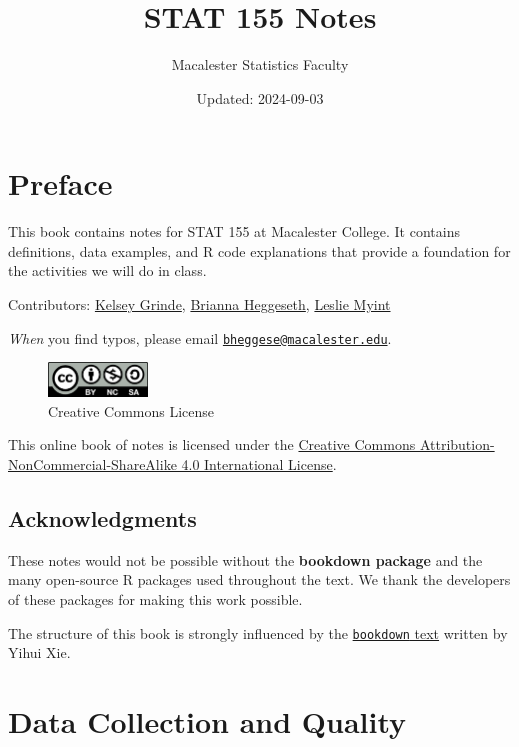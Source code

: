 \documentclass[
]{book}
\title{STAT 155 Notes}
\author{Macalester Statistics Faculty}
\date{Updated: 2024-09-03}
\begin{document}
\maketitle

{
\setcounter{tocdepth}{2}
\tableofcontents
}
\chapter*{Preface}\label{preface}


This book contains notes for STAT 155 at Macalester College. It contains definitions, data examples, and R code explanations that provide a foundation for the activities we will do in class.

Contributors: \href{https://kegrinde.github.io/}{Kelsey Grinde}, \href{https://bcheggeseth.github.io}{Brianna Heggeseth}, \href{https://www.lesliemyint.org/}{Leslie Myint}

\emph{When} you find typos, please email \href{mailto:bheggese@macalester.edu}{\nolinkurl{bheggese@macalester.edu}}.

\begin{figure}
\centering
\includegraphics[width=1.04167in,height=\textheight]{Photos/by-nc-sa.png}
\caption{Creative Commons License}
\end{figure}

This online book of notes is licensed under the \href{http://creativecommons.org/licenses/by-nc-sa/4.0/}{Creative Commons Attribution-NonCommercial-ShareAlike 4.0 International License}.

\section*{Acknowledgments}\label{acknowledgments}


These notes would not be possible without the \textbf{bookdown package} and the many open-source R packages used throughout the text. We thank the developers of these packages for making this work possible.

The structure of this book is strongly influenced by the \href{https://bookdown.org/yihui/bookdown}{\texttt{bookdown} text} written by Yihui Xie.

\chapter{Data Collection and Quality}\label{data-collection-and-quality}
\end{document}
